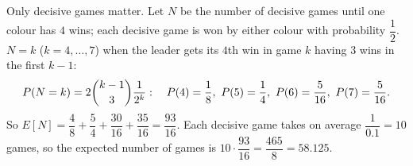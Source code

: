 Only decisive games matter. Let $N$ be the number of decisive games until one colour has $4$ wins; each decisive game is won by either colour with probability $\dfrac{1}{2}$. $N=k$ ($k=4,\dots,7$) when the leader gets its $4$th win in game $k$ having $3$ wins in the first $k-1$:
\[P(N=k)=2\dbinom{k-1}{3}\dfrac{1}{2^k}:\quad P(4)=\dfrac{1}{8},\ P(5)=\dfrac{1}{4},\ P(6)=\dfrac{5}{16},\ P(7)=\dfrac{5}{16}.\]
So $E[N]=\dfrac{4}{8}+\dfrac{5}{4}+\dfrac{30}{16}+\dfrac{35}{16}=\dfrac{93}{16}$. Each decisive game takes on average $\dfrac{1}{0.1}=10$ games, so the expected number of games is $10\cdot\dfrac{93}{16}=\boxed{\dfrac{465}{8}}=58.125$.
